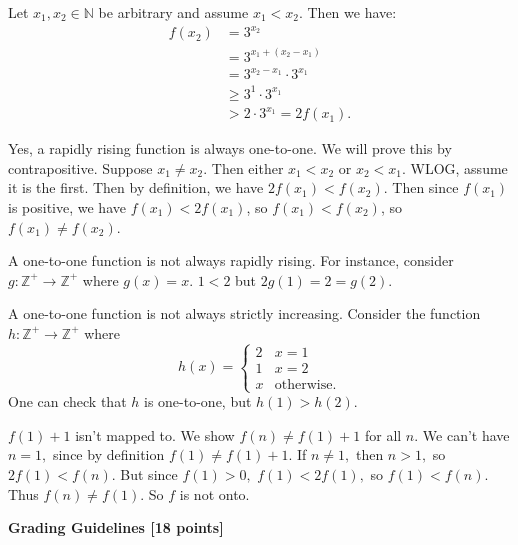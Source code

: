 \documentclass[12pt]{exam}
\begin{document}
\begin{solution}
\begin{qparts}
    \item Let $x_1, x_2 \in \mathbb{N}$ be arbitrary and assume $x_1 < x_2$. 
    Then we have:
    \begin{align*}
        f(x_2) &= 3^{x_2} \\
        &= 3^{x_1 + (x_2 - x_1)} \\
        &= 3^{x_2 - x_1} \cdot 3^{x_1} \\
        &\ge 3^1 \cdot 3^{x_1} \tag{$x_1 < x_2$, so $x_2 - x_1 \ge 1$} \\
        &> 2 \cdot 3^{x_1} = 2f(x_1).
    \end{align*}

    \item Yes, a rapidly rising function is always one-to-one. We will prove this by contrapositive. Suppose $x_1 \neq x_2$. Then either $x_1 < x_2$ or $x_2 < x_1$. WLOG, assume it is the first. Then by definition, we have $2f(x_1) < f(x_2)$. Then since $f(x_1)$ is positive, we have $f(x_1) < 2f(x_1)$, so $f(x_1) < f(x_2)$,
    so $f(x_1) \neq f(x_2)$.

    A one-to-one function is not always rapidly rising. For instance, consider $g\colon\mathbb{Z}^+\to\mathbb{Z}^+$ where $g(x)=x.$ $1<2$ but $2g(1)=2=g(2).$

    A one-to-one function is not always strictly increasing. Consider the function $h\colon\mathbb{Z}^+\to\mathbb{Z}^+$ where
    $$h(x)=\begin{cases}
        2 & x = 1 \\
        1 & x = 2 \\
        x & \text{otherwise.}
    \end{cases}$$
    One can check that $h$ is one-to-one, but $h(1)>h(2).$

    \item  $f(1) + 1$ isn't mapped to. We show $f(n)\ne f(1)+1$ for all $n.$ We can't have $n=1,$ since by definition $f(1)\ne f(1)+1.$ If $n\ne 1,$ then $n>1,$ so $2f(1)<f(n).$ But since $f(1)>0,$ $f(1)<2f(1),$ so $f(1)<f(n).$ Thus $f(n)\ne f(1).$ So $f$ is not onto.
\end{qparts}

\textbf{Grading Guidelines [18 points]}


\end{solution}
\end{document}
